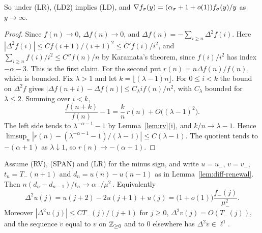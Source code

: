So under (LR), (LD2) implies (LD), and $\nabla f_\sigma(y)=(\alpha_\sigma+1+o(1))f_\sigma(y)/y$ as
$y\to\infty$.

\begin{proof}
Since $f(n)\to0$, $\Delta f(n)\to0$, and $\Delta f(n)=-\sum_{i\ge n}\Delta^2f(i)$. Here
$|\Delta^2f(i)|\le Cf(i+1)/(i+1)^2\le C'f(i)/i^2$, and $\sum_{i\ge n}f(i)/i^2\le C''f(n)/n$ by
Karamata's theorem, since $f(i)/i^2$ has index $-\alpha-3$. This is the first claim. For the
second put $r(n)=n\Delta f(n)/f(n)$, which is bounded. Fix $\lambda>1$ and let
$k=\lfloor(\lambda-1)n\rfloor$. For $0\le i<k$ the bound on $\Delta^2f$ gives
$|\Delta f(n+i)-\Delta f(n)|\le C_\lambda if(n)/n^2$, with $C_\lambda$ bounded for
$\lambda\le2$. Summing over $i<k$,
\[
 \frac{f(n+k)}{f(n)}-1=\frac kn\,r(n)+O\bigl((\lambda-1)^2\bigr).
\]
The left side tends to $\lambda^{-\alpha-1}-1$ by Lemma~\ref{lem:rv}(i), and $k/n\to\lambda-1$.
Hence $\limsup_n|r(n)-(\lambda^{-\alpha-1}-1)/(\lambda-1)|\le C(\lambda-1)$. The quotient tends to
$-(\alpha+1)$ as $\lambda\downarrow1$, so $r(n)\to-(\alpha+1)$.
\end{proof}

\begin{lemma}\label{lem:second-renewal}
Assume (RV), (SPAN) and (LR) for the minus sign, and write $u=u_\minus$, $v=v_\minus$,
$t_n=T_\minus(n+1)$ and $d_n=u(n)-u(n-1)$ as in Lemma~\ref{lem:diff-renewal}. Then
$n(d_n-d_{n-1})/t_n\to\alpha_\minus/\mu_\minus^2$. Equivalently
\[
 \Delta^2u(j)=u(j+2)-2u(j+1)+u(j)=\bigl(1+o(1)\bigr)\frac{f_\minus(j)}{\mu_\minus^2}.
\]
Moreover $|\Delta^2u(j)|\le CT_\minus(j)/(j+1)$ for $j\ge0$, $\Delta^2v(j)=O(T_\minus(j))$, and the
sequence $\tilde v$ equal to $v$ on $\mathbb{Z}_{\ge0}$ and to $0$ elsewhere has $\Delta^2\tilde v\in\ell^1$.
\end{lemma}

